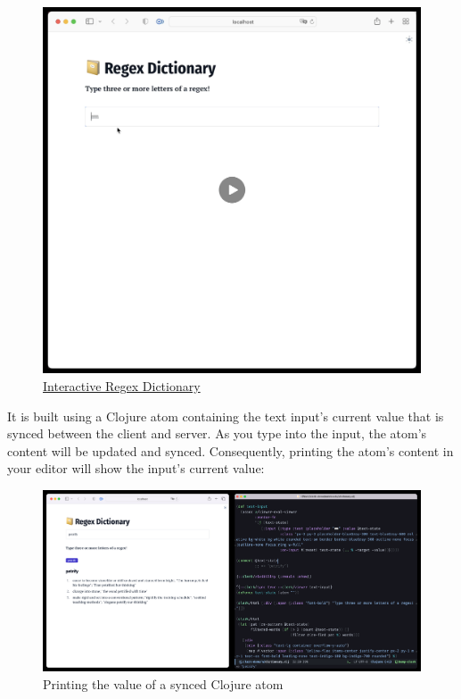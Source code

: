 \documentclass[sigconf,screen]{acmart}
\begin{document}
\begin{figure}[H]
\centering
\includegraphics{images/interactive-regex-dictionary.png}
\caption{\href{https://cdn.nextjournal.com/data/QmP1pT3ysiZzw5fUhxmpGHCZregtMYcpu3Sue7Q1eSETCo?content-type=image/png}{Interactive Regex Dictionary}}
\end{figure}

It is built using a Clojure atom containing the text input's current value that is synced between the client and server. As you type into the input, the atom's content will be updated and synced. Consequently, printing the atom's content in your editor will show the input's current value:

\begin{figure}[H]
\centering
\includegraphics{images/printing-the-value-of-a-synced-clojure-atom.png}
\caption{Printing the value of a synced Clojure atom}
\end{figure}
\end{document}
